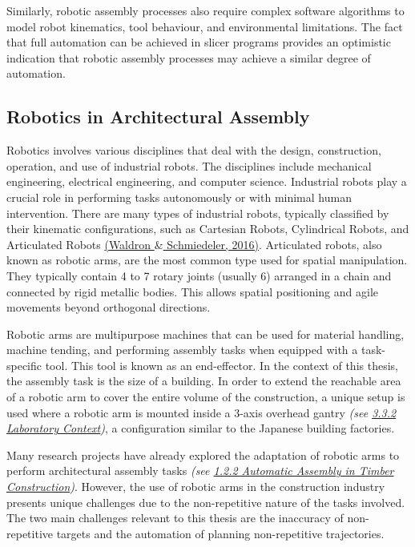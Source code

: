 \documentclass[11pt]{book}
\begin{document}
Similarly, robotic assembly processes also require complex software algorithms to model robot kinematics, tool behaviour, and environmental limitations. The fact that full automation can be achieved in slicer programs provides an optimistic indication that robotic assembly processes may achieve a similar degree of automation.

\subsection{Robotics in Architectural Assembly}

Robotics involves various disciplines that deal with the design, construction, operation, and use of industrial robots. The disciplines include mechanical engineering, electrical engineering, and computer science. Industrial robots play a crucial role in performing tasks autonomously or with minimal human intervention. There are many types of industrial robots, typically classified by their kinematic configurations, such as Cartesian Robots, Cylindrical Robots, and Articulated Robots \href{https://www.zotero.org/google-docs/?GleUjw}{(Waldron $\&$ Schmiedeler, 2016)}. Articulated robots, also known as robotic arms, are the most common type used for spatial manipulation. They typically contain 4 to 7 rotary joints (usually 6) arranged in a chain and connected by rigid metallic bodies. This allows spatial positioning and agile movements beyond orthogonal directions.

Robotic arms are multipurpose machines that can be used for material handling, machine tending, and performing assembly tasks when equipped with a task-specific tool. This tool is known as an end-effector. In the context of this thesis, the assembly task is the size of a building. In order to extend the reachable area of a robotic arm to cover the entire volume of the construction, a unique setup is used where a robotic arm is mounted inside a 3-axis overhead gantry\textit{ (see \uline{3.3.2 Laboratory Context})}, a configuration similar to the Japanese building factories.

Many research projects have already explored the adaptation of robotic arms to perform architectural assembly tasks \textit{(see \uline{1.2.2 Automatic Assembly in Timber Construction})}. However, the use of robotic arms in the construction industry presents unique challenges due to the non-repetitive nature of the tasks involved. The two main challenges relevant to this thesis are the inaccuracy of non-repetitive targets and the automation of planning non-repetitive trajectories.
\end{document}

